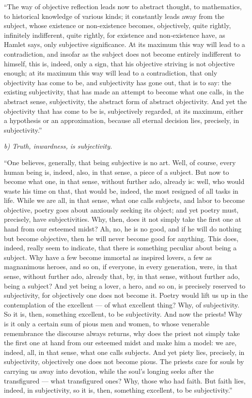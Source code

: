 \documentclass[12pt]{book}
\begin{document}
``The way of objective reflection leads now to abstract thought, to mathematics, to historical knowledge of various kinds; it constantly leads away from the subject, whose existence or non-existence becomes, objectively, quite rightly, infinitely indifferent, quite rightly, for existence and non-existence have, as Hamlet says, only subjective significance. At its maximum this way will lead to a contradiction, and insofar as the subject does not become entirely indifferent to himself, this is, indeed, only a sign, that his objective striving is not objective enough; at its maximum this way will lead to a contradiction, that only objectivity has come to be, and subjectivity has gone out, that is to say: the existing subjectivity, that has made an attempt to become what one calls, in the abstract sense, subjectivity, the abstract form of abstract objectivity. And yet the objectivity that has come to be is,
subjectively regarded, at its maximum, either a hypothesis or an approximation, because all eternal decision lies, precisely, in subjectivity.''

\begin{center}
\emph{b) Truth, inwardness, is subjectivity.}
\end{center}

``One believes, generally, that being subjective is no art. Well, of course, every human being is, indeed, also, in that sense, a piece of a subject. But now to become what one, in that sense, without further ado, already is: well, who would waste his time on that, that would be, indeed, the most resigned of all tasks in life. While we are all, in that sense, what one calls subjects, and labor to become objective, poetry goes about anxiously seeking its object; and yet poetry must, precisely, have subjectivities. Why, then, does it not simply take the first one at hand from our esteemed midst? Ah, no, he is no good, and if he will do nothing but become objective, then he will never become good for anything. This does, indeed, really seem to indicate, that there is something peculiar about being a subject. Why have a few become immortal as inspired lovers, a few as magnanimous heroes, and so on, if everyone, in every generation, were, in that sense, without further ado, already that, by, in that sense, without further ado, being a subject? And yet being a lover, a hero, and so on, is precisely reserved to subjectivity, for objectively one does not become it. Poetry would lift us up in the contemplation of the excellent --- of what excellent thing? Why, of subjectivity. So it is, then, something
excellent, to be subjectivity. And now the priests! Why is it only a certain sum of pious men and women, to whose venerable remembrance the discourse always returns, why does the priest not simply take the first one at hand from our esteemed midst and make him a model: we are, indeed, all, in that sense, what one calls subjects. And yet piety lies, precisely, in subjectivity, objectively one does not become pious. The priests care for souls by carrying us away into devotion, while the soul's longing seeks after the transfigured --- what transfigured ones? Why, those who had faith. But faith lies, indeed, in subjectivity, so it is, then, something excellent, to be subjectivity.''
\end{document}
